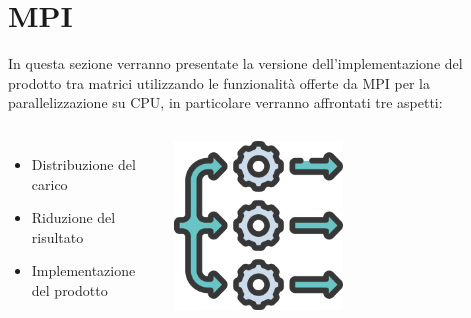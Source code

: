 \documentclass[compress]{beamer}
\begin{document}
\section{MPI}

\begin{frame}{\secname}
    In questa sezione verranno presentate la versione dell'implementazione del prodotto tra matrici utilizzando le funzionalità offerte da MPI per la parallelizzazione su CPU, in particolare verranno affrontati tre aspetti:
    \vspace{0.5cm}
    \begin{columns}
            \begin{minipage}[b]{1\textwidth}
                \begin{itemize}
                    \item Distribuzione del carico
                    \item Riduzione del risultato
                    \item Implementazione del prodotto
                \end{itemize}
            \end{minipage}
                \begin{minipage}{1\textwidth}
                    \begin{adjustbox}{margin=0cm 0cm 0cm 0.3cm, center} %
                        \includegraphics[width=0.5\textwidth]{resources/parallel_icon.png}
                    \end{adjustbox}
                \end{minipage}
    \end{columns}
\end{frame}
\end{document}
